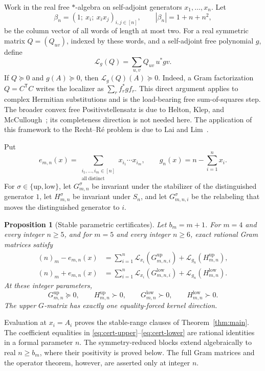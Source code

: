 \documentclass[11pt]{article}
\newtheorem{proposition}[theorem]{Proposition}
\newcommand{\Lcal}{\mathcal L}
\newcommand{\fall}[2]{(#1)_{#2}}
\newcommand{\up}{\mathrm{up}}
\newcommand{\low}{\mathrm{low}}
\begin{document}
Work in the real free \(*\)-algebra on self-adjoint generators \(x_1,\ldots,x_n\).  Let
\[
 \beta_n=(1;\ x_i;\ x_ix_j)_{i,j\in[n]},
 \qquad |\beta_n|=1+n+n^2,
\]
be the column vector of all words of length at most two.  For a real symmetric matrix \(Q=(Q_{uv})\), indexed by these words, and a self-adjoint free polynomial \(g\), define
\[
 \Lcal_g(Q)=\sum_{u,v}Q_{uv}\,u^\ast gv.
\]
If \(Q\succeq0\) and \(g(A)\succeq0\), then \(\Lcal_g(Q)(A)\succeq0\).  Indeed, a Gram factorization \(Q=C^{\mathsf T}C\) writes the localizer as \(\sum_r f_r^\ast g f_r\).  This direct argument applies to complex Hermitian substitutions and is the load-bearing free sum-of-squares step.  The broader convex free Positivstellensatz is due to Helton, Klep, and McCullough~\cite{HKM2012}; its completeness direction is not needed here.  The application of this framework to the Recht--R\'e problem is due to Lai and Lim~\cite{LaiLim2020}.

Put
\[
 e_{m,n}(x)=
 \sum_{\substack{i_1,\ldots,i_m\in[n]\\\mathrm{all\ distinct}}}
 x_{i_1}\cdots x_{i_m},
 \qquad
 g_n(x)=n-\sum_{i=1}^n x_i.
\]
For \(\sigma\in\{\up,\low\}\), let \(G_{m,n}^{\sigma}\) be invariant under the stabilizer of the distinguished generator \(1\), let \(H_{m,n}^{\sigma}\) be invariant under \(S_n\), and let \(G_{m,n,i}^{\sigma}\) be the relabeling that moves the distinguished generator to \(i\).

\begin{proposition}[Stable parametric certificates]\label{prop:parametric}
Let \(b_m=m+1\).  For \(m=4\) and every integer \(n\ge5\), and for \(m=5\) and every integer \(n\ge6\), exact rational Gram matrices satisfy
\begin{align}
 \fall nm-e_{m,n}(x)
 &=\sum_{i=1}^n\Lcal_{x_i}(G_{m,n,i}^{\up})
   +\Lcal_{g_n}(H_{m,n}^{\up}),\label{eq:cert-upper}\\
 \fall nm+e_{m,n}(x)
 &=\sum_{i=1}^n\Lcal_{x_i}(G_{m,n,i}^{\low})
   +\Lcal_{g_n}(H_{m,n}^{\low}).\label{eq:cert-lower}
\end{align}
At these integer parameters,
\[
 G_{m,n}^{\up}\succeq0,\qquad
 H_{m,n}^{\up}\succ0,\qquad
 G_{m,n}^{\low}\succ0,\qquad
 H_{m,n}^{\low}\succ0.
\]
The upper \(G\)-matrix has exactly one equality-forced kernel direction.
\end{proposition}

Evaluation at \(x_i=A_i\) proves the stable-range clauses of Theorem~\ref{thm:main}.  The coefficient equalities in \eqref{eq:cert-upper}--\eqref{eq:cert-lower} are rational identities in a formal parameter \(n\).  The symmetry-reduced blocks extend algebraically to real \(n\ge b_m\), where their positivity is proved below.  The full Gram matrices and the operator theorem, however, are asserted only at integer \(n\).
\end{document}
